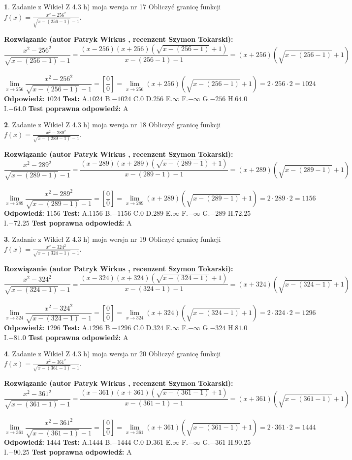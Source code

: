 \documentclass[12pt, a4paper]{article}
\theoremstyle{definition} %
\newtheorem{zad}{}
\newcommand{\zadStart}[1]{\begin{zad}#1\newline}
\newcommand{\zadStop}{\end{zad}}
\newcommand{\rozwStart}[2]{\noindent \textbf{Rozwiązanie (autor #1 , recenzent #2): }\newline}
\newcommand{\rozwStop}{\newline}
\newcommand{\odpStart}{\noindent \textbf{Odpowiedź:}\newline}
\newcommand{\odpStop}{\newline}
\newcommand{\testStart}{\noindent \textbf{Test:}\newline}
\newcommand{\testStop}{\newline}
\newcommand{\kluczStart}{\noindent \textbf{Test poprawna odpowiedź:}\newline}
\newcommand{\kluczStop}{\newline}
\begin{document}
\zadStart{Zadanie z Wikieł Z 4.3 h) moja wersja nr 17}
Obliczyć granicę funkcji $f(x)=\frac{x^{2} - 256^{2}}{\sqrt{x-(256-1)}-1}$.
\zadStop
\rozwStart{Patryk Wirkus}{Szymon Tokarski}
$$\frac{x^{2} - 256^{2}}{\sqrt{x-(256-1)}-1}=\frac{(x-256)(x+256)(\sqrt{x-(256-1)}+1)}{x-(256-1)-1}=(x+256)(\sqrt{x-(256-1)}+1)$$
\\
$$\lim\limits_{x\to 256}\frac{x^{2} - 256^{2}}{\sqrt{x-(256-1)}-1}=[\frac{0}{0}]=
\lim\limits_{x\to 256}(x+256)(\sqrt{x-(256-1)}+1) = 2\cdot256 \cdot 2 = 1024$$
\rozwStop
\odpStart
$1024$
\odpStop
\testStart
A.$1024$
B.$-1024$
C.$0$
D.$256$
E.$\infty$
F.$-\infty$
G.$-256$
H.$64.0$
I.$-64.0$
\testStop
\kluczStart
A
\kluczStop



\zadStart{Zadanie z Wikieł Z 4.3 h) moja wersja nr 18}
Obliczyć granicę funkcji $f(x)=\frac{x^{2} - 289^{2}}{\sqrt{x-(289-1)}-1}$.
\zadStop
\rozwStart{Patryk Wirkus}{Szymon Tokarski}
$$\frac{x^{2} - 289^{2}}{\sqrt{x-(289-1)}-1}=\frac{(x-289)(x+289)(\sqrt{x-(289-1)}+1)}{x-(289-1)-1}=(x+289)(\sqrt{x-(289-1)}+1)$$
\\
$$\lim\limits_{x\to 289}\frac{x^{2} - 289^{2}}{\sqrt{x-(289-1)}-1}=[\frac{0}{0}]=
\lim\limits_{x\to 289}(x+289)(\sqrt{x-(289-1)}+1) = 2\cdot289 \cdot 2 = 1156$$
\rozwStop
\odpStart
$1156$
\odpStop
\testStart
A.$1156$
B.$-1156$
C.$0$
D.$289$
E.$\infty$
F.$-\infty$
G.$-289$
H.$72.25$
I.$-72.25$
\testStop
\kluczStart
A
\kluczStop



\zadStart{Zadanie z Wikieł Z 4.3 h) moja wersja nr 19}
Obliczyć granicę funkcji $f(x)=\frac{x^{2} - 324^{2}}{\sqrt{x-(324-1)}-1}$.
\zadStop
\rozwStart{Patryk Wirkus}{Szymon Tokarski}
$$\frac{x^{2} - 324^{2}}{\sqrt{x-(324-1)}-1}=\frac{(x-324)(x+324)(\sqrt{x-(324-1)}+1)}{x-(324-1)-1}=(x+324)(\sqrt{x-(324-1)}+1)$$
\\
$$\lim\limits_{x\to 324}\frac{x^{2} - 324^{2}}{\sqrt{x-(324-1)}-1}=[\frac{0}{0}]=
\lim\limits_{x\to 324}(x+324)(\sqrt{x-(324-1)}+1) = 2\cdot324 \cdot 2 = 1296$$
\rozwStop
\odpStart
$1296$
\odpStop
\testStart
A.$1296$
B.$-1296$
C.$0$
D.$324$
E.$\infty$
F.$-\infty$
G.$-324$
H.$81.0$
I.$-81.0$
\testStop
\kluczStart
A
\kluczStop



\zadStart{Zadanie z Wikieł Z 4.3 h) moja wersja nr 20}
Obliczyć granicę funkcji $f(x)=\frac{x^{2} - 361^{2}}{\sqrt{x-(361-1)}-1}$.
\zadStop
\rozwStart{Patryk Wirkus}{Szymon Tokarski}
$$\frac{x^{2} - 361^{2}}{\sqrt{x-(361-1)}-1}=\frac{(x-361)(x+361)(\sqrt{x-(361-1)}+1)}{x-(361-1)-1}=(x+361)(\sqrt{x-(361-1)}+1)$$
\\
$$\lim\limits_{x\to 361}\frac{x^{2} - 361^{2}}{\sqrt{x-(361-1)}-1}=[\frac{0}{0}]=
\lim\limits_{x\to 361}(x+361)(\sqrt{x-(361-1)}+1) = 2\cdot361 \cdot 2 = 1444$$
\rozwStop
\odpStart
$1444$
\odpStop
\testStart
A.$1444$
B.$-1444$
C.$0$
D.$361$
E.$\infty$
F.$-\infty$
G.$-361$
H.$90.25$
I.$-90.25$
\testStop
\kluczStart
A
\kluczStop
\end{document}
